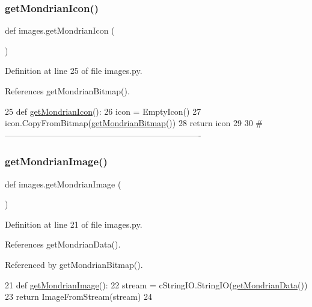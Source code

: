 \subsubsection{\texorpdfstring{get\+Mondrian\+Icon()}{getMondrianIcon()}}
{\footnotesize\ttfamily def images.\+get\+Mondrian\+Icon (\begin{DoxyParamCaption}{ }\end{DoxyParamCaption})}



Definition at line 25 of file images.\+py.



References get\+Mondrian\+Bitmap().


\begin{DoxyCode}
25 \textcolor{keyword}{def }\hyperlink{namespaceimages_a95681a3eaa29e37a999d212c55b552f3}{getMondrianIcon}():
26     icon = EmptyIcon()
27     icon.CopyFromBitmap(\hyperlink{namespaceimages_a3ae00d30a729f478de891d5d97fb7608}{getMondrianBitmap}())
28     \textcolor{keywordflow}{return} icon
29 
30 \textcolor{comment}{#----------------------------------------------------------------------}
\end{DoxyCode}
\mbox{\label{namespaceimages_a02fd56f1e295f6d744c8e3ce0a34fdb9}} 
\subsubsection{\texorpdfstring{get\+Mondrian\+Image()}{getMondrianImage()}}
{\footnotesize\ttfamily def images.\+get\+Mondrian\+Image (\begin{DoxyParamCaption}{ }\end{DoxyParamCaption})}



Definition at line 21 of file images.\+py.



References get\+Mondrian\+Data().



Referenced by get\+Mondrian\+Bitmap().


\begin{DoxyCode}
21 \textcolor{keyword}{def }\hyperlink{namespaceimages_a02fd56f1e295f6d744c8e3ce0a34fdb9}{getMondrianImage}():
22     stream = cStringIO.StringIO(\hyperlink{namespaceimages_aecec2b84a11430cc4d1eac8aa019d74a}{getMondrianData}())
23     \textcolor{keywordflow}{return} ImageFromStream(stream)
24 
\end{DoxyCode}
\mbox{\label{namespaceimages_add10ebe4b5b0704d2b1672509e931db3}} 
